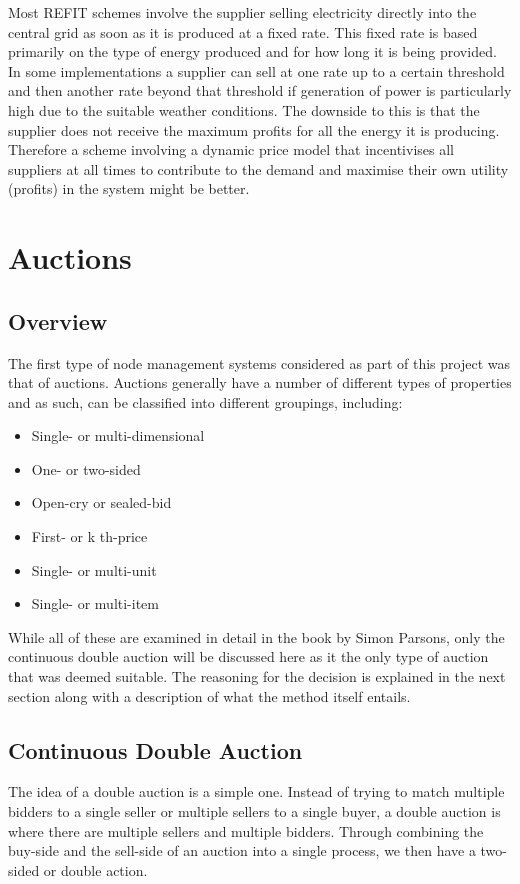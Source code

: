\documentclass[a4paper, notitlepage]{report}
\begin{document}
Most REFIT schemes involve the supplier selling electricity directly into the
central grid as soon as it is produced at a fixed rate. This fixed rate is based
primarily on the type of energy produced and for how long it is being provided.
In some implementations a supplier can sell at one rate up to a certain
threshold and then another rate beyond that threshold if generation of power is
particularly high due to the suitable weather conditions. The downside to this
is that the supplier does not receive the maximum profits for all the energy it
is producing. Therefore a scheme involving a dynamic price model that incentivises
all suppliers at all times to contribute to the demand and maximise their own
utility (profits) in the system might be better.
\chapter{Auctions}
\label{sec:org5999b9a}
\section{Overview}
\label{sec:org091d4a9}
The first type of node management systems considered as part of this project was
that of auctions. Auctions generally have a number of different types of
properties \cite{parsons2011auctions} and as such, can be classified into
different groupings, including: 

\begin{itemize}
\item Single- or multi-dimensional
\item One- or two-sided
\item Open-cry or sealed-bid
\item First- or k th-price
\item Single- or multi-unit
\item Single- or multi-item
\end{itemize}

While all of these are examined in detail in the book by Simon Parsons, only the
continuous double auction will be discussed here as it the only type of auction
that was deemed suitable. The reasoning for the decision is explained in the
next section along with a description of what the method itself entails.
\section{Continuous Double Auction}
\label{sec:orgb7f2823}
The idea of a double auction is a simple one. Instead of trying to match
multiple bidders to a single seller or multiple sellers to a single buyer, a
double auction is where there are multiple sellers and multiple bidders. Through
combining the buy-side and the sell-side of an auction into a single process, we
then have a two-sided or double action. 
\end{document}
